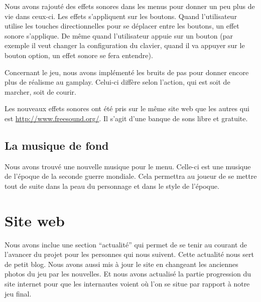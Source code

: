 \documentclass[11pt]{report}
\begin{document}
Nous avons rajouté des effets sonores dans les menus pour donner un peu plus de vie dans ceux-ci. Les effets s’appliquent sur les boutons. Quand l’utilisateur utilise les touches directionnelles pour se déplacer entre les boutons, un effet sonore s’applique. De même quand l’utilisateur appuie sur un bouton (par exemple il veut changer la configuration du clavier, quand il va appuyer sur le bouton option, un effet sonore se fera entendre).

Concernant le jeu, nous avons implémenté les bruits de pas pour donner encore plus de réalisme au gamplay. Celui-ci diffère selon l’action, qui est soit de marcher, soit de courir.

Les nouveaux effets sonores ont été pris sur le même site web que les autres qui est \url{http://www.freesound.org/}. Il s’agit d’une banque de sons libre et gratuite.

\subsection{La musique de fond}

Nous avons trouvé une nouvelle musique pour le menu. Celle-ci est une musique de l’époque de la seconde guerre mondiale. Cela permettra au joueur de se mettre tout de suite dans la peau du personnage et dans le style de l’époque.

\newpage
\section{Site web}

Nous avons inclue une section ``actualité'' qui permet de se tenir au courant de l’avancer du projet pour les personnes qui nous suivent. Cette actualité nous sert de petit blog. Nous avons aussi mis à jour le site en changeant les anciennes photos du jeu par les nouvelles. Et nous avons actualisé la partie progression du site internet pour que les internautes voient où l'on se situe par rapport à notre jeu final.\\
\end{document}
